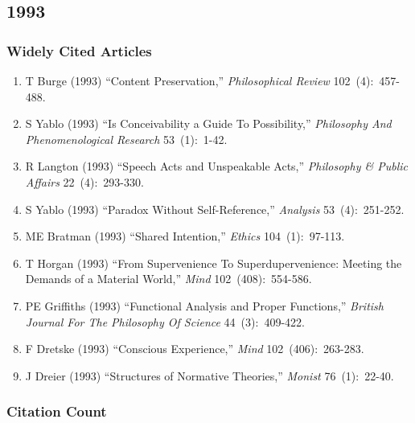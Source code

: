 \documentclass[
  10pt,
  letterpaper,
  DIV=11,
  numbers=noendperiod,
  twoside]{scrartcl}
\providecommand{\tightlist}{%
  \setlength{\itemsep}{0pt}\setlength{\parskip}{0pt}}\usepackage{longtable,booktabs,array}
\begin{document}
\newpage

\subsection{1993}\label{sec-s1993}

\subsubsection*{Widely Cited Articles}\label{widely-cited-articles-37}

\begin{enumerate}
\def\labelenumi{\arabic{enumi}.}
\tightlist
\item
  T Burge (1993) ``Content Preservation,'' \emph{Philosophical Review}
  102~(4):~457-488.
\item
  S Yablo (1993) ``Is Conceivability a Guide To Possibility,''
  \emph{Philosophy And Phenomenological Research} 53~(1):~1-42.
\item
  R Langton (1993) ``Speech Acts and Unspeakable Acts,''
  \emph{Philosophy \& Public Affairs} 22~(4):~293-330.
\item
  S Yablo (1993) ``Paradox Without Self-Reference,'' \emph{Analysis}
  53~(4):~251-252.
\item
  ME Bratman (1993) ``Shared Intention,'' \emph{Ethics} 104~(1):~97-113.
\item
  T Horgan (1993) ``From Supervenience To Superdupervenience: Meeting
  the Demands of a Material World,'' \emph{Mind} 102~(408):~554-586.
\item
  PE Griffiths (1993) ``Functional Analysis and Proper Functions,''
  \emph{British Journal For The Philosophy Of Science} 44~(3):~409-422.
\item
  F Dretske (1993) ``Conscious Experience,'' \emph{Mind}
  102~(406):~263-283.
\item
  J Dreier (1993) ``Structures of Normative Theories,'' \emph{Monist}
  76~(1):~22-40.
\end{enumerate}

\subsubsection*{Citation Count}\label{sec-count-1993}
\end{document}
